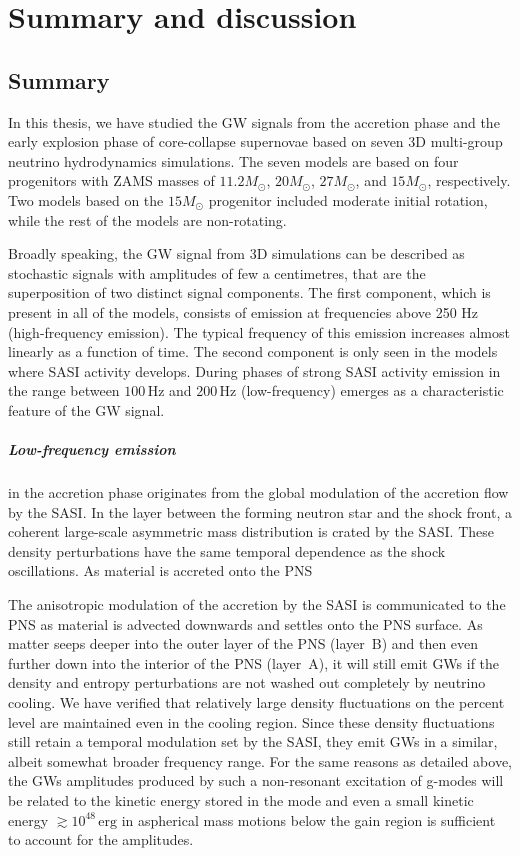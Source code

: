 \chapter{Summary and discussion}
\section{Summary}
In this thesis, we have studied the GW signals from the accretion phase and the early
explosion phase of core-collapse supernovae based on seven 3D
multi-group neutrino hydrodynamics simulations. The seven models are based on four progenitors
with ZAMS masses of $11.2 M_\odot$, $20 M_\odot$, $27 M_\odot$, and $15 M_\odot$, respectively.
Two models based on the $15 M_\odot$ progenitor included moderate initial rotation, while the
rest of the models are non-rotating.

Broadly speaking, the GW signal from 3D simulations can be described as stochastic signals with 
amplitudes of few a centimetres, that are the superposition of two distinct signal components.
The first component, which is present in all of the models, consists of emission at frequencies
above 250 Hz (high-frequency emission). The typical frequency of this emission increases 
almost linearly as a function of time. The second component is only seen in the models where
SASI activity develops. During phases of strong SASI activity 
emission in the range between $100 \, \mathrm{Hz}$ and $200 \, \mathrm{Hz}$ (low-frequency) 
emerges as a characteristic feature of the GW signal.


\paragraph{Low-frequency emission} in the accretion phase 
originates from the global modulation of the accretion flow by the SASI.
In the layer between the forming neutron star and the shock front, a coherent large-scale
asymmetric mass distribution is crated by the SASI. 
These density perturbations have the same temporal dependence as the shock oscillations.  
As material is accreted onto the PNS 

The anisotropic modulation of the accretion by the SASI is 
communicated to the PNS as material is advected downwards and settles
onto the PNS surface. As matter seeps deeper into the outer layer of the PNS (layer~B) and
then even further down into the interior of the PNS (layer~A), it will still
emit GWs if the density and entropy perturbations are
not washed out completely by neutrino cooling. We have verified that
relatively large density fluctuations on the percent level are maintained
even in the cooling region. Since these density fluctuations still
retain a temporal modulation set by the SASI, they emit GWs in a similar, albeit somewhat broader frequency range. For the
same reasons as detailed above, the GWs amplitudes produced by
such a non-resonant excitation of g-modes will be related to
the kinetic energy stored in the mode and even a small kinetic
energy $\gtrsim 10^{48}  \, \mathrm{erg}$ in aspherical
mass motions below the gain region is sufficient to account
for the amplitudes.

